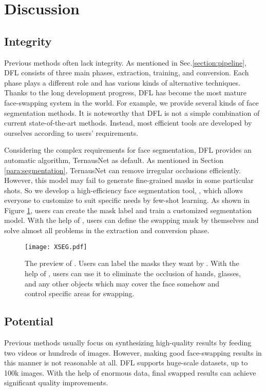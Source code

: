 \documentclass[10pt,twocolumn,letterpaper]{article}
\begin{document}
\section{Discussion}
\subsection{Integrity}
Previous methods often lack integrity. As mentioned in Sec.\ref{section:pipeline}, DFL consists of three main phases, extraction, training, and conversion. Each phase plays a different role and has various kinds of alternative techniques. Thanks to the long development progress, DFL has become the most mature face-swapping system in the world. For example, we provide several kinds of face segmentation methods. It is noteworthy that DFL is not a simple combination of current state-of-the-art methods. Instead, most efficient tools are developed by ourselves according to users' requirements.

Considering the complex requirements for face segmentation, DFL provides an automatic algorithm, TernausNet\cite{iglovikov2018ternausnet} as default. As mentioned in Section \ref{para:segmentation}, TernausNet can remove irregular occlusions efficiently. However, this model may fail to generate fine-grained masks in some particular shots. So we develop a high-efficiency face segmentation tool, , which allows everyone to customize to suit specific needs by few-shot learning. As shown in Figure \ref{fig:xseg}, users can create the mask label and train a customized segmentation model. With the help of , users can define the swapping mask by themselves and solve almost all problems in the extraction and conversion phase.
\begin{figure}[htpb]
	\begin{center}
		\texttt{[image: XSEG.pdf]}
	\end{center}
	\caption{The preview of . Users can label the masks they want by . With the help of , users can use it to eliminate the occlusion of hands, glasses, and any other objects which may cover the face somehow and control specific areas for swapping.}
	\label{fig:xseg}
\end{figure}
\subsection{Potential}
Previous methods usually focus on synthesizing high-quality results by feeding two videos or hundreds of images. However, making good face-swapping results in this manner is not reasonable at all. DFL supports huge-scale datasets, up to  100k images. With the help of enormous data, final swapped results can achieve significant quality improvements.
\end{document}
